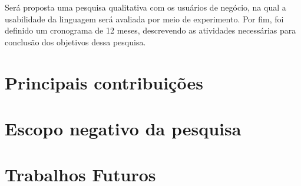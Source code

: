 Será proposta uma pesquisa qualitativa com os usuários de negócio, na qual a usabilidade da linguagem será avaliada por meio de experimento. Por fim, foi definido um cronograma de 12 meses, descrevendo as atividades necessárias para conclusão dos objetivos dessa 
pesquisa.



\section{Principais contribuições}
\label{principaiscontribuicoes}

\section{Escopo negativo da pesquisa}
\label{escoponegativo}

\section{Trabalhos Futuros}
\label{trabalhosfuturos}